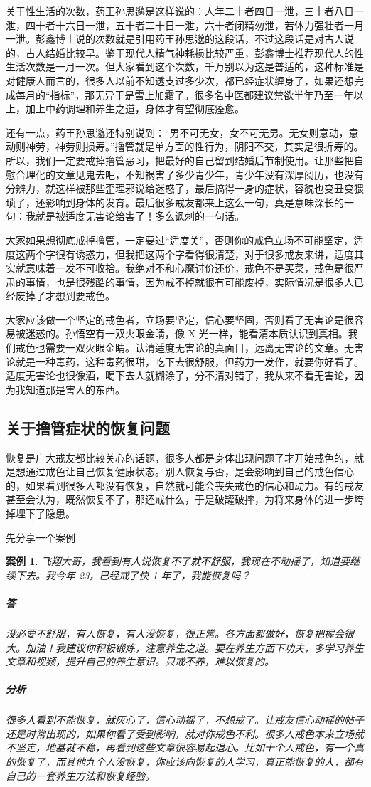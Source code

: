\documentclass{ctexart}
\newtheorem{case}{案例}
\begin{document}
关于性生活的次数，药王孙思邈是这样说的：人年二十者四日一泄，三十者八日一泄，四十者十六日一泄，五十者二十日一泄，六十者闭精勿泄，若体力强壮者一月一泄。彭鑫博士说的次数就是引用药王孙思邈的这段话，不过这段话是对古人说的，古人结婚比较早。鉴于现代人精气神耗损比较严重，彭鑫博士推荐现代人的性生活次数是一月一次。但大家看到这个次数，千万别以为这是普适的，这种标准是对健康人而言的，很多人以前不知透支过多少次，都已经症状缠身了，如果还想完成每月的“指标”，那无异于是雪上加霜了。很多名中医都建议禁欲半年乃至一年以上，加上中药调理和养生之道，身体才有望彻底痊愈。

还有一点，药王孙思邈还特别说到：“男不可无女，女不可无男。无女则意动，意动则神劳，神劳则损寿。”撸管就是单方面的性行为，阴阳不交，其实是很折寿的。所以，我们一定要戒掉撸管恶习，把最好的自己留到结婚后节制使用。让那些把自慰合理化的文章见鬼去吧，不知祸害了多少青少年，青少年没有深厚阅历，也没有分辨力，就这样被那些歪理邪说给迷惑了，最后搞得一身的症状，容貌也变丑变猥琐了，还影响到身体的发育。最后很多戒友都来上这么一句，真是意味深长的一句：我就是被适度无害论给害了！多么讽刺的一句话。

大家如果想彻底戒掉撸管，一定要过“适度关”，否则你的戒色立场不可能坚定，适度这两个字很有诱惑力，但我把这两个字看得很清楚，对于很多戒友来讲，适度其实就意味着一发不可收拾。我绝对不和心魔讨价还价，戒色不是买菜，戒色是很严肃的事情，也是很残酷的事情，因为戒不掉就很有可能废掉，实际情况是很多人已经废掉了才想到要戒色。

大家应该做一个坚定的戒色者，立场要坚定，信心要坚固，否则看了无害论是很容易被迷惑的。孙悟空有一双火眼金睛，像 X 光一样，能看清本质认识到真相。我们戒色也需要一双火眼金睛。认清适度无害论的真面目，远离无害论的文章。无害论就是一种毒药，这种毒药很甜，吃下去很舒服，但药力一发作，就要你好看了。适度无害论也很像酒，喝下去人就糊涂了，分不清对错了，我从来不看无害论，因为我知道那是害人的东西。

\subsection{关于撸管症状的恢复问题}

恢复是广大戒友都比较关心的话题，很多人都是身体出现问题了才开始戒色的，就是想通过戒色让自己恢复健康状态。别人恢复与否，是会影响到自己的戒色信心的，如果看到很多人都没有恢复，自然就可能会丧失戒色的信心和动力。有的戒友甚至会认为，既然恢复不了，那还戒什么，于是破罐破摔，为将来身体的进一步垮掉埋下了隐患。

先分享一个案例

\begin{case}
    飞翔大哥，我看到有人说恢复不了就不舒服，我现在不动摇了，知道要继续下去。我今年 23，已经戒了快 1 年了，我能恢复吗？
    \subparagraph{答} 没必要不舒服，有人恢复，有人没恢复，很正常。各方面都做好，恢复把握会很大。加油！我建议你积极锻炼，注意养生之道。要在养生方面下功夫，多学习养生文章和视频，提升自己的养生意识。只戒不养，难以恢复的。
    \subparagraph{分析} 很多人看到不能恢复，就灰心了，信心动摇了，不想戒了。让戒友信心动摇的帖子还是时常出现的，如果你看了受到影响，就对你戒色不利。很多人戒色本来立场就不坚定，地基就不稳，再看到这些文章很容易起退心。比如十个人戒色，有一个真的恢复了，而其他九个人没恢复，你应该向恢复的人学习，真正能恢复的人，都有自己的一套养生方法和恢复经验。
\end{case}
\end{document}
